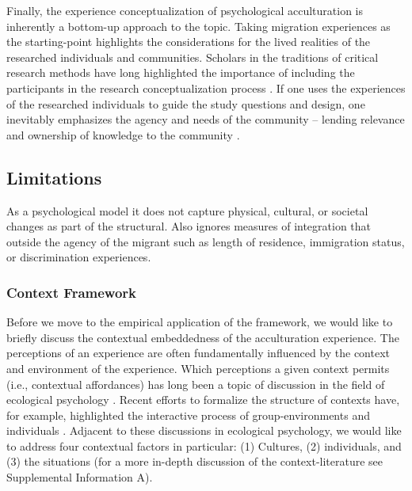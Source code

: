 \documentclass[man, 12pt, a4paper]{apa7}
\begin{document}
Finally, the experience conceptualization of psychological acculturation is inherently a bottom-up approach to the topic. Taking migration experiences as the starting-point highlights the considerations for the lived realities of the researched individuals and communities. Scholars in the traditions of critical research methods have long highlighted the importance of including the participants in the research conceptualization process \citep[e.g.,][]{Kovach2009}. If one uses the experiences of the researched individuals to guide the study questions and design, one inevitably emphasizes the agency and needs of the community -- lending relevance and ownership of knowledge to the community \citep[e.g., ][]{Schmidt2021}.

\subsection{Limitations}
As a psychological model it does not capture physical, cultural, or societal changes as part of the structural. Also ignores measures of integration that outside the agency of the migrant such as length of residence, immigration status, or discrimination experiences.

\subsubsection{Context Framework}
Before we move to the empirical application of the framework, we would like to briefly discuss the contextual embeddedness of the acculturation experience. 
The perceptions of an experience are often fundamentally influenced by the context and environment of the experience. Which perceptions a given context permits (i.e., contextual affordances) has long been a topic of discussion in the field of ecological psychology \citep[e.g., see][]{Cantor1994}. Recent efforts to formalize the structure of contexts have, for example, highlighted the interactive process of group-environments and individuals \citep[e.g.,][]{Young2002}.
Adjacent to these discussions in ecological psychology, we would like to address four contextual factors in particular: (1) Cultures, (2) individuals, and (3) the situations (for a more in-depth discussion of the context-literature see Supplemental Information A).
\end{document}
